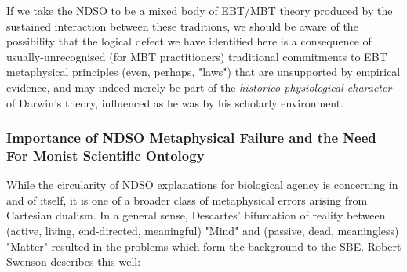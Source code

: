 If we take the NDSO to be a mixed body of EBT/MBT theory produced by the sustained interaction between these traditions, we should be aware of the possibility that the logical defect we have identified here is a consequence of usually-unrecognised (for MBT practitioners) traditional commitments to EBT metaphysical principles (even, perhaps, "laws") that are unsupported by empirical evidence, and may indeed merely be part of the \textit{historico-physiological character} of Darwin's theory, influenced as he was by his scholarly environment.

\subsubsection{Importance of NDSO Metaphysical Failure and the Need For Monist Scientific Ontology}

While the circularity of NDSO explanations for biological agency is concerning in and of itself, it is one of a broader class of metaphysical errors arising from Cartesian dualism. In a general sense, Descartes' bifurcation of reality between (active, living, end-directed, meaningful) "Mind" and (passive, dead, meaningless) "Matter" resulted in the problems which form the background to the \hyperref[SBE]{SBE}. Robert Swenson describes this well:

